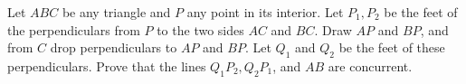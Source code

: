 Let $ABC$ be any triangle and $P$ any point in its interior. Let $P_1, P_2$ be the feet of the perpendiculars from $P$ to the two sides $AC$ and $BC$. Draw $AP$ and $BP$, and from $C$ drop perpendiculars to $AP$ and $BP$. Let $Q_1$ and $Q_2$ be the feet of these perpendiculars. Prove that the lines $Q_1P_2, Q_2P_1$, and $AB$ are concurrent.
